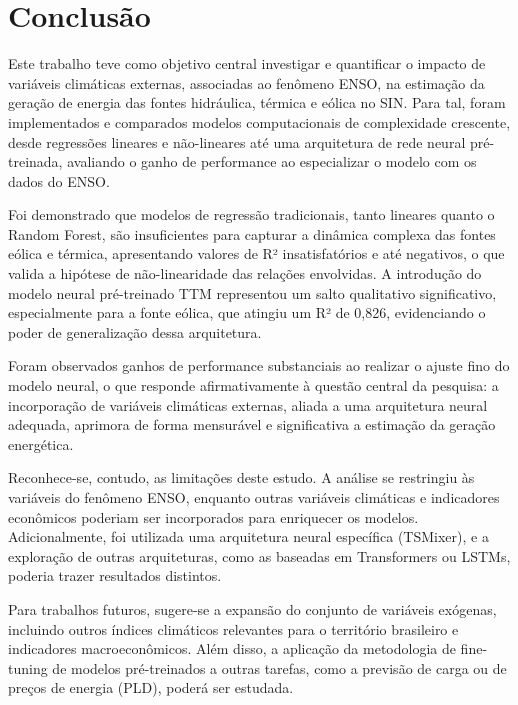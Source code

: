 \chapter{Conclusão}
Este trabalho teve como objetivo central investigar e quantificar o impacto de variáveis climáticas externas, associadas ao 
fenômeno ENSO, na estimação da geração de energia das fontes hidráulica, térmica e eólica no SIN. 
Para tal, foram implementados e comparados modelos computacionais de complexidade crescente, desde regressões lineares e 
não-lineares até uma arquitetura de rede neural pré-treinada, avaliando o ganho de performance ao especializar o modelo com 
os dados do ENSO.

Foi demonstrado que modelos de regressão tradicionais, tanto lineares quanto o Random Forest, são insuficientes para capturar 
a dinâmica complexa das fontes eólica e térmica, apresentando valores de R² insatisfatórios e até negativos, o que valida 
a hipótese de não-linearidade das relações envolvidas. A introdução do modelo neural pré-treinado TTM 
representou um salto qualitativo significativo, especialmente para a fonte eólica, que atingiu um R² de 0,826, evidenciando 
o poder de generalização dessa arquitetura.

Foram observados ganhos de performance substanciais ao realizar o ajuste fino do modelo neural, o que responde afirmativamente 
à questão central da pesquisa: a incorporação de variáveis climáticas externas, aliada a uma arquitetura neural adequada, 
aprimora de forma mensurável e significativa a estimação da geração energética.

Reconhece-se, contudo, as limitações deste estudo. A análise se restringiu às variáveis do fenômeno ENSO, enquanto outras 
variáveis climáticas e indicadores econômicos poderiam ser incorporados para enriquecer os modelos. Adicionalmente, foi 
utilizada uma arquitetura neural específica (TSMixer), e a exploração de outras arquiteturas, como as baseadas em Transformers 
ou LSTMs, poderia trazer resultados distintos.

Para trabalhos futuros, sugere-se a expansão do conjunto de variáveis exógenas, incluindo outros índices 
climáticos relevantes para o território brasileiro e indicadores macroeconômicos. Além disso, a aplicação da metodologia de 
fine-tuning de modelos pré-treinados a outras tarefas, como a previsão de carga ou de preços de energia (PLD), poderá ser estudada.